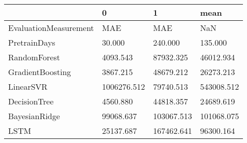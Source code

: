 \begin{tabular}{llll}
\toprule
{} &            0 &           1 &        mean \\
\midrule
EvaluationMeasurement &          MAE &         MAE &         NaN \\
PretrainDays          &       30.000 &     240.000 &     135.000 \\
RandomForest          &     4093.543 &   87932.325 &   46012.934 \\
GradientBoosting      &     3867.215 &   48679.212 &   26273.213 \\
LinearSVR             &  1006276.512 &   79740.513 &  543008.512 \\
DecisionTree          &     4560.880 &   44818.357 &   24689.619 \\
BayesianRidge         &    99068.637 &  103067.513 &  101068.075 \\
LSTM                  &    25137.687 &  167462.641 &   96300.164 \\
\bottomrule
\end{tabular}
